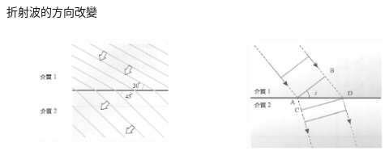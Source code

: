 \documentclass[13pt]{beamer}
\begin{document}
\begin{frame}{折射波的方向改變}
    \begin{columns}
        \begin{figure}
            \centering
            \includegraphics[width=\linewidth]{images/Screenshot 2023-09-27 at 8.51.39 PM.png}


        \end{figure}
        \begin{figure}
            \centering
            \includegraphics[width=1\linewidth]{images/Screenshot 2023-09-27 at 8.47.44 PM.png}

        \end{figure}
    \end{columns}


\end{frame}
\end{document}
